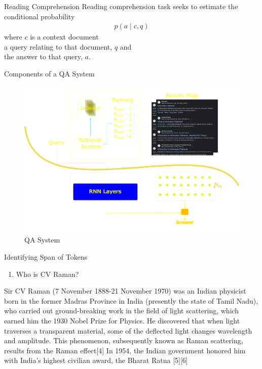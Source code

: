 \begin{frame}{Reading Comprehension}
    \Large
    Reading comprehension task seeks to estimate the conditional probability
    \begin{align}
        p(a\mid c, q)
    \end{align}where $c$ is a context document\\
    a query relating to that document, $q$ and \\
    the answer to that query, $a$.
\end{frame}
\begin{frame}{Components of a QA System}
    \begin{figure}
        \centering
        \includegraphics[width=0.7\linewidth]{Images/SimpleRetriever}
        \caption{QA System}
        \label{fig:simpleretriever}
    \end{figure}

\end{frame}
\begin{frame}{Identifying Span of Tokens}
    \begin{minipage}{0.35\linewidth}
        \begin{enumerate}
            \item[] Who is CV Raman?
        \end{enumerate}
    \end{minipage}
    \begin{minipage}{0.6\linewidth}

        Sir CV Raman (7 November 1888-21 November 1970) was an \colorbox{yellow!55}{\color{blue}Indian physicist} born in the former Madras Province in India (presently the state of Tamil Nadu), who carried out ground-breaking work in the field of light scattering, which earned him the 1930 Nobel Prize for Physics. He discovered that when light traverses a transparent material, some of the deflected light changes wavelength and amplitude. This phenomenon, subsequently known as Raman scattering, results from the Raman effect[4] In 1954, the Indian government honored him with India's highest civilian award, the Bharat Ratna [5][6]
    \end{minipage}
\end{frame}

